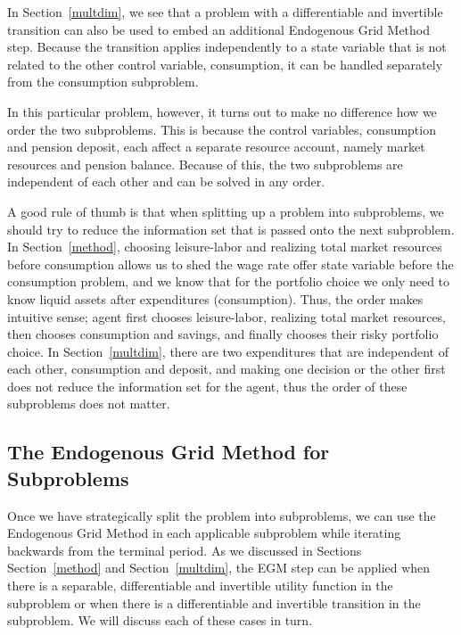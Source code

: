 \documentclass{article}
\begin{document}
In Section~\ref{multdim}, we see that a problem with a differentiable and invertible transition can also be used to embed an additional Endogenous Grid Method step. Because the transition applies independently to a state variable that is not related to the other control variable, consumption, it can be handled separately from the consumption subproblem.


In this particular problem, however, it turns out to make no difference how we order the two subproblems. This is because the control variables, consumption and pension deposit, each affect a separate resource account, namely market resources and pension balance. Because of this, the two subproblems are independent of each other and can be solved in any order.

A good rule of thumb is that when splitting up a problem into subproblems, we should try to reduce the information set that is passed onto the next subproblem. In Section~\ref{method}, choosing leisure-labor and realizing total market resources before consumption allows us to shed the wage rate offer state variable before the consumption problem, and we know that for the portfolio choice we only need to know liquid assets after expenditures (consumption). Thus, the order makes intuitive sense; agent first chooses leisure-labor, realizing total market resources, then chooses consumption and savings, and finally chooses their risky portfolio choice. In Section~\ref{multdim}, there are two expenditures that are independent of each other, consumption and deposit, and making one decision or the other first does not reduce the information set for the agent, thus the order of these subproblems does not matter.

\subsection{The Endogenous Grid Method for Subproblems}\label{The Endogenous Grid Method for Subproblems}

Once we have strategically split the problem into subproblems, we can use the Endogenous Grid Method in each applicable subproblem while iterating backwards from the terminal period. As we discussed in Sections Section~\ref{method} and Section~\ref{multdim}, the EGM step can be applied when there is a separable, differentiable and invertible utility function in the subproblem or when there is a differentiable and invertible transition in the subproblem. We will discuss each of these cases in turn.
\end{document}
